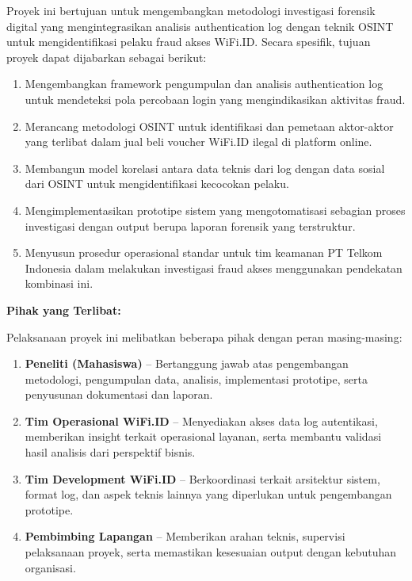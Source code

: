 \documentclass{ittelkom_ppi}
\begin{document}
Proyek ini bertujuan untuk mengembangkan metodologi investigasi forensik digital yang mengintegrasikan analisis authentication log dengan teknik OSINT untuk mengidentifikasi pelaku fraud akses WiFi.ID. Secara spesifik, tujuan proyek dapat dijabarkan sebagai berikut:

\begin{enumerate}
    \item Mengembangkan framework pengumpulan dan analisis authentication log untuk mendeteksi pola percobaan login yang mengindikasikan aktivitas fraud.
    
    \item Merancang metodologi OSINT untuk identifikasi dan pemetaan aktor-aktor yang terlibat dalam jual beli voucher WiFi.ID ilegal di platform online.
    
    \item Membangun model korelasi antara data teknis dari log dengan data sosial dari OSINT untuk mengidentifikasi kecocokan pelaku.
    
    \item Mengimplementasikan prototipe sistem yang mengotomatisasi sebagian proses investigasi dengan output berupa laporan forensik yang terstruktur.
    
    \item Menyusun prosedur operasional standar untuk tim keamanan PT Telkom Indonesia dalam melakukan investigasi fraud akses menggunakan pendekatan kombinasi ini.
\end{enumerate}

\textbf{Pihak yang Terlibat:}

Pelaksanaan proyek ini melibatkan beberapa pihak dengan peran masing-masing:

\begin{enumerate}
    \item \textbf{Peneliti (Mahasiswa)} -- Bertanggung jawab atas pengembangan metodologi, pengumpulan data, analisis, implementasi prototipe, serta penyusunan dokumentasi dan laporan.
    
    \item \textbf{Tim Operasional WiFi.ID} -- Menyediakan akses data log autentikasi, memberikan insight terkait operasional layanan, serta membantu validasi hasil analisis dari perspektif bisnis.
    
    \item \textbf{Tim Development WiFi.ID} -- Berkoordinasi terkait arsitektur sistem, format log, dan aspek teknis lainnya yang diperlukan untuk pengembangan prototipe.
    
    \item \textbf{Pembimbing Lapangan} -- Memberikan arahan teknis, supervisi pelaksanaan proyek, serta memastikan kesesuaian output dengan kebutuhan organisasi.
\end{enumerate}
\end{document}
